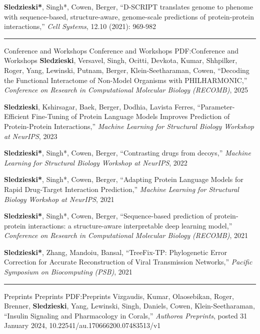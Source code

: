 \documentclass[letterpaper,MMMyyyy,nonstopmode]{simpleresumecv}
\begin{document}
\begin{Body}
\Gap
\NumberedItem{[1]}
{{\textbf{Sledzieski*}, Singh*, Cowen, Berger}, 
``D-SCRIPT translates genome to phenome with sequence-based, structure-aware, genome-scale predictions of protein-protein interactions,'' 
 \textit{Cell Systems}, 12.10 (2021): 969-982
}


\BigGap
\hrule
\Section
{Conference and Workshops}
{Conference and Workshops}
{PDF:Conference and Workshops}
\Gap
\NumberedItem{[6]}
{{\textbf{Sledzieski}, Versavel, Singh, Ocitti, Devkota, Kumar, Shhpilker, Roger, Yang, Lewinski, Putnam, Berger, Klein-Seetharaman, Cowen}, 
``Decoding the Functional Interactome of Non-Model Organisms with PHILHARMONIC,'' 
 \textit{Conference on Research in Computational Molecular Biology (RECOMB)}, 2025
}

\Gap
\NumberedItem{[5]}
{{\textbf{Sledzieski}, Kshirsagar, Baek, Berger, Dodhia, Lavista Ferres}, 
``Parameter-Efficient Fine-Tuning of Protein Language Models Improves Prediction of Protein-Protein Interactions,'' 
 \textit{Machine Learning for Structural Biology Workshop at NeurIPS}, 2023
}

\Gap
\NumberedItem{[4]}
{{\textbf{Sledzieski*}, Singh*, Cowen, Berger}, 
``Contrasting drugs from decoys,'' 
 \textit{Machine Learning for Structural Biology Workshop at NeurIPS}, 2022
}

\Gap
\NumberedItem{[3]}
{{\textbf{Sledzieski*}, Singh*, Cowen, Berger}, 
``Adapting Protein Language Models for Rapid Drug-Target Interaction Prediction,'' 
 \textit{Machine Learning for Structural Biology Workshop at NeurIPS}, 2021
}

\Gap
\NumberedItem{[2]}
{{\textbf{Sledzieski*}, Singh*, Cowen, Berger}, 
``Sequence-based prediction of protein-protein interactions: a structure-aware interpretable deep learning model,'' 
 \textit{Conference on Research in Computational Molecular Biology (RECOMB)}, 2021
}

\Gap
\NumberedItem{[1]}
{{\textbf{Sledzieski*}, Zhang, Mandoiu, Bansal}, 
``TreeFix-TP: Phylogenetic Error Correction for Accurate Reconstruction of Viral Transmission Networks,'' 
 \textit{Pacific Symposium on Biocomputing (PSB)}, 2021
}


\BigGap
\hrule
\Section
{Preprints}
{Preprints}
{PDF:Preprints}
\Gap
\NumberedItem{[2]}
{{Vizgaudis, Kumar, Olaosebikan, Roger, Brenner, \textbf{Sledzieski}, Yang, Lewinski, Singh, Daniels, Cowen, Klein-Seetharaman}, 
``Insulin Signaling and Pharmacology in Corals,'' 
 \textit{Authorea Preprints}, posted 31 January 2024, 10.22541/au.170666200.07483513/v1
}


\end{Body}
\end{document}
